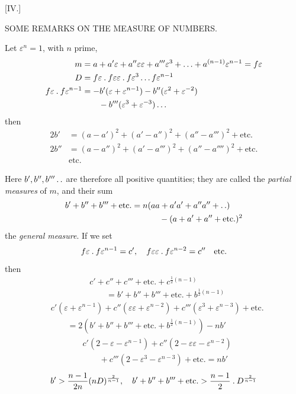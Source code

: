 %
\begin{center}[IV.]\par\medskip
SOME REMARKS ON THE MEASURE OF NUMBERS.
\end{center}
Let $\varepsilon^n=1$, with $n$ prime,
\[
\begin{aligned}
m&=a+a'\varepsilon+a''\varepsilon\varepsilon+a'''\varepsilon^3+\ldots+a^{(n-1)}\varepsilon^{n-1}=f\varepsilon\\
D&=f\varepsilon\mathbin{.} f\varepsilon\varepsilon\mathbin{.} f\varepsilon^3\ldots f\varepsilon^{n-1}\\
f\varepsilon\mathbin{.} f\varepsilon^{n-1}&=-b'(\varepsilon+\varepsilon^{n-1})-b''(\varepsilon^2+\varepsilon^{-2})\\
&\qquad-b'''(\varepsilon^3+\varepsilon^{-3})\ldots
\end{aligned}
\]
then
\[
\begin{aligned}
2b'&=(a-a')^2+(a'-a'')^2+(a''-a''')^2+\text{etc.}\\
2b''&=(a-a'')^2+(a'-a''')^2+(a''-a'''')^2+\text{etc.}\\
&\text{etc.}
\end{aligned}
\]

Here $b',b'',b'''\mathinner{.\,.}$ are therefore all positive quantities; they are called the \emph{partial measures} of $m$, and their sum
\[
\begin{aligned}
b'+b''+b'''+\text{etc.}={}&n(aa+a'a'+a''a''+\mathinner{.\,.})\\
&\qquad-(a+a'+a''+\text{etc.})^2
\end{aligned}
\]
the \emph{general measure}. If we set
\[
f\varepsilon\mathbin{.} f\varepsilon^{n-1}=c',\quad f\varepsilon\varepsilon\mathbin{.} f\varepsilon^{n-2}=c''\quad\text{etc.}
\]
then
\[
\begin{aligned}
&c'+c''+c'''+\text{etc.}+c^{\frac12(n-1)}\\
&\qquad=b'+b''+b'''+\text{etc.}+b^{\frac12(n-1)}
\end{aligned}
\]
\[
\begin{aligned}
&c'(\varepsilon+\varepsilon^{n-1})+c''(\varepsilon\varepsilon+\varepsilon^{n-2})+c'''(\varepsilon^3+\varepsilon^{n-3})+\text{etc.}\\
&\qquad=2(b'+b''+b'''+\text{etc.}+b^{\frac12(n-1)})-nb'
\end{aligned}
\]
\[
\begin{aligned}
&c'(2-\varepsilon-\varepsilon^{n-1})+c''(2-\varepsilon\varepsilon-\varepsilon^{n-2})\\
&\qquad+c'''(2-\varepsilon^3-\varepsilon^{n-3})+\text{etc.}=nb'
\end{aligned}
\]
\[
b'>\frac{n-1}{2n}(nD)^{\frac2{n-1}},\quad b'+b''+b'''+\text{etc.}>\frac{n-1}{2}\mathbin{.} D^{\frac2{n-1}}
\]

